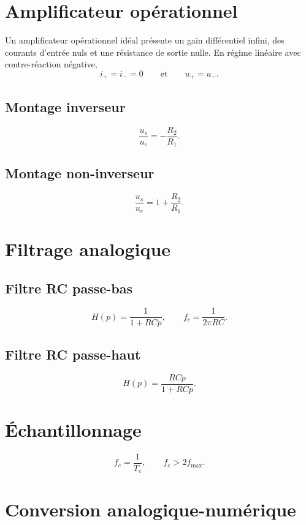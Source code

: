 \section{Amplificateur opérationnel}\label{sec:elec-aop}

Un amplificateur opérationnel idéal présente un gain différentiel infini, des courants d'entrée nuls et une résistance de sortie nulle. En régime linéaire avec contre-réaction négative,
\[
i_+=i_-=0
\qquad\text{et}\qquad
u_+=u_-.
\]

\subsection{Montage inverseur}
\TLAOPInverseur
\[
\boxed{\frac{u_s}{u_e}=-\frac{R_2}{R_1}}.
\]

\subsection{Montage non-inverseur}
\TLAOPNonInverseur
\[
\boxed{\frac{u_s}{u_e}=1+\frac{R_2}{R_1}}.
\]

\section{Filtrage analogique}\label{sec:elec-filtrage}

\subsection{Filtre RC passe-bas}
\TLFiltreRCPasseBas
\[
H(p)=\frac{1}{1+RCp},
\qquad
f_c=\frac{1}{2\pi RC}.
\]

\subsection{Filtre RC passe-haut}
\TLFiltreRCPasseHaut
\[
H(p)=\frac{RCp}{1+RCp}.
\]

\section{Échantillonnage}\label{sec:elec-echantillonnage}

\TLEchantillonnageSignal
\[
f_e=\frac{1}{T_e},
\qquad
\boxed{f_e>2f_{\max}}.
\]

\section{Conversion analogique-numérique}\label{sec:elec-can}

